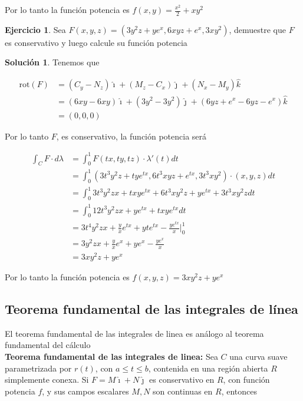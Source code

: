 \documentclass{article}
\theoremstyle{plain}
\theoremstyle{definition}
\newtheorem{ejer}[thm]{Ejercicio}
\newtheorem{sol}[thm]{Solución}
\begin{document}
Por lo tanto la funci\'on potencia es $f(x,y) = \displaystyle \frac{x^2}{2}+xy^2$


\begin{ejer}Sea $F(x,y,z) =(3y^2z+ye^x,6xyz+e^x,3xy^2)$, demuestre que $F$ es conservativo y luego calcule su funci\'on potencia \\
\end{ejer}

\begin{sol}Tenemos que
\end{sol}

\begin{align*}
     \text{rot} ( F )  &= (C_y-N_z)\hat{\imath}+ (M_z-C_x)\hat{\jmath}+ (N_x-M_y)\hat{k} \\
     &= (6xy-6xy)\hat{\imath}+(3y^2-3y^2)\hat{\jmath}+(6yz+e^x-6yz-e^x)\hat{k} \\
     &= (0,0,0)
\end{align*}

Por lo tanto $F$, es conservativo, la funci\'on potencia ser\'a

\begin{align*}
    \int_C F \cdot d\lambda &= \int_0^1 F(tx,ty,tz) \cdot \lambda'(t)dt \\
    &= \int_0^1 (3t^3y^2z+tye^{tx},6t^3xyz+e^{tx},3t^3xy^2) \cdot (x,y,z)dt \\
    &= \int_0^1 3t^3y^2zx+txye^{tx} + 6t^3xy^2z+ye^{tx}+ 3t^3xy^2zdt \\
    &= \int_0^1 12t^3y^2zx+ye^{tx}  + txye^{tx} dt\\
    &= 3t^4y^2zx+\frac{y}{x}e^{tx}+yte^{tx}-\frac{ye^{tx}}{x} \bigg|_0^1 \\
    &= 3y^2zx+\frac{y}{x}e^x+ye^{x}-\frac{ye^{x}}{x} \\
    &= 3xy^2z+ye^x
\end{align*}

Por lo tanto la funci\'on potencia es $f(x,y,z) = 3xy^2z+ye^x$


\newpage


\subsection{Teorema fundamental de las integrales de l\'inea}

El teorema fundamental de las integrales de linea es an\'alogo al teorema fundamental del c\'alculo\\

\textbf{ Teorema fundamental de las integrales de linea: }Sea $C$ una curva suave parametrizada por $r(t)$, con $a \leq t \leq b$, contenida en una región abierta $R$ simplemente conexa.   Si  $F = M\hat{\imath} + N\hat{\jmath}$  es conservativo en $R$, con funci\'on potencia $f$,  y sus campos escalares $M, N$ son continuas en $R$, entonces
\end{document}
